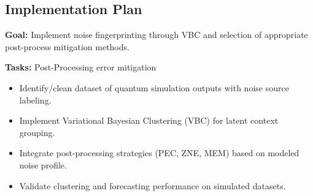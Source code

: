 \documentclass[12pt]{article}
\newenvironment{tightitemize}{
  \begin{itemize}\setlength\itemsep{0pt}\setlength\parskip{0pt}\setlength\parsep{0pt}}
  {\end{itemize}}
\begin{document}
\subsection*{Implementation Plan}
\textbf{Goal:} Implement noise fingerprinting through VBC and selection of appropriate post-process mitigation methods.

\vspace{0.5em}
\noindent\textbf{Tasks:} Post-Processing error mitigation
\begin{tightitemize}%
    \item Identify/clean dataset of quantum simulation outputs with noise source labeling.
    \item Implement Variational Bayesian Clustering (VBC) for latent context grouping.
    \item Integrate post-processing strategies (PEC, ZNE, MEM) based on modeled noise profile.
    \item Validate clustering and forecasting performance on simulated datasets.
\end{tightitemize}




\vspace{1em}
\end{document}
